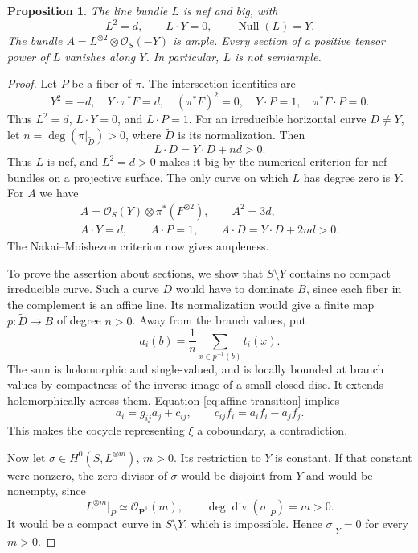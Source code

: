 \documentclass[11pt]{amsart}
\newtheorem{proposition}[theorem]{Proposition}
\theoremstyle{definition}
\theoremstyle{remark}
\numberwithin{equation}{section}
\newcommand{\PP}{\mathbf P}
\newcommand{\OO}{\mathcal O}
\begin{document}
\begin{proposition}\label{prop:ruled-geometry}
The line bundle $L$ is nef and big, with
\[
 L^2=d,\qquad L\cdot Y=0,\qquad
 \operatorname{Null}(L)=Y.
\]
The bundle $A=L^{\otimes2}\otimes\OO_S(-Y)$ is ample.
Every section of a positive tensor power of $L$ vanishes along $Y$.
In particular, $L$ is not semiample.
\end{proposition}
\begin{proof}
Let $P$ be a fiber of $\pi$. The intersection identities are
\[
 Y^2=-d,\quad Y\cdot\pi^*F=d,\quad (\pi^*F)^2=0,
 \quad Y\cdot P=1,\quad \pi^*F\cdot P=0.
\]
Thus $L^2=d$, $L\cdot Y=0$, and $L\cdot P=1$.
For an irreducible horizontal curve $D\ne Y$, let
$n=\deg(\pi|_{\widetilde D})>0$, where $\widetilde D$ is its
normalization. Then
\[
 L\cdot D=Y\cdot D+nd>0.
\]
Thus $L$ is nef, and $L^2=d>0$ makes it big by the numerical
criterion for nef bundles on a projective surface. The only curve on
which $L$ has degree zero is $Y$. For $A$ we have
\[
 \begin{gathered}
 A=\OO_S(Y)\otimes\pi^*(F^{\otimes2}),\qquad A^2=3d,\\
 A\cdot Y=d,\qquad A\cdot P=1,\qquad
 A\cdot D=Y\cdot D+2nd>0.
 \end{gathered}
\]
The Nakai--Moishezon criterion now gives ampleness.

To prove the assertion about sections, we show that $S\setminus Y$
contains no compact irreducible curve. Such a curve $D$ would have
to dominate $B$, since each fiber in the complement is an affine
line. Its normalization would give a finite map $p:\widetilde D\to B$
of degree $n>0$. Away from the branch values,
put
\[
 a_i(b)=\frac1n\sum_{x\in p^{-1}(b)}t_i(x).
\]
The sum is holomorphic and single-valued, and is locally bounded
at branch values by compactness of the inverse image of a small
closed disc. It extends holomorphically across them. Equation
\eqref{eq:affine-transition} implies
\[
 a_i=g_{ij}a_j+c_{ij},\qquad
 c_{ij}f_i=a_if_i-a_jf_j.
\]
This makes the cocycle representing $\xi$ a coboundary, a
contradiction.

Now let $\sigma\in H^0(S,L^{\otimes m})$, $m>0$.
Its restriction to $Y$ is constant. If that constant were nonzero,
the zero divisor of $\sigma$ would be disjoint from $Y$ and would
be nonempty, since
\[
 L^{\otimes m}|_P\simeq\OO_{\PP^1}(m),\qquad
 \deg\operatorname{div}(\sigma|_P)=m>0.
\]
It would be a compact curve in $S\setminus Y$, which is
impossible. Hence $\sigma|_Y=0$ for every $m>0$.
\end{proof}
\end{document}
